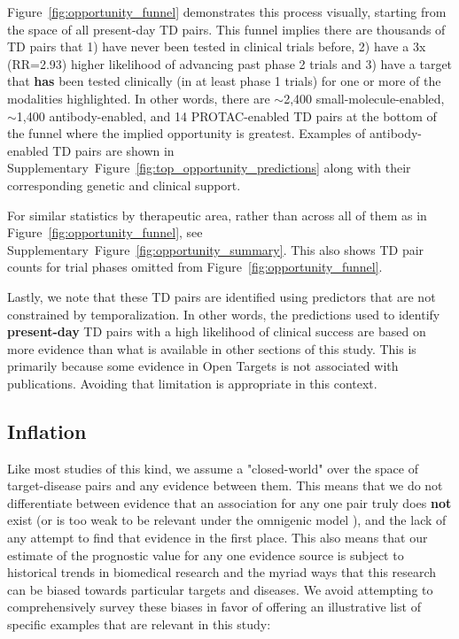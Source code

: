 \documentclass{article}
\begin{document}
Figure~\ref{fig:opportunity_funnel} demonstrates this process visually, starting from the space of all present-day TD pairs. This funnel implies there are thousands of TD pairs that 1) have never been tested in clinical trials before, 2) have a 3x (RR=2.93) higher likelihood of advancing past phase 2 trials and 3) have a target that \textbf{has} been tested clinically (in at least phase 1 trials) for one or more of the 
modalities highlighted. In other words, there are $\sim$2,400 small-molecule-enabled, $\sim$1,400 antibody-enabled, and 14 PROTAC-enabled TD pairs at the bottom of the funnel where the implied opportunity is greatest. Examples of antibody-enabled TD pairs are shown in Supplementary~Figure~\ref{fig:top_opportunity_predictions} along with their corresponding genetic and clinical support.

For similar statistics by therapeutic area, rather than across all of them as in Figure~\ref{fig:opportunity_funnel}, see Supplementary~Figure~\ref{fig:opportunity_summary}. This also shows TD pair counts for trial phases omitted from Figure~\ref{fig:opportunity_funnel}.

Lastly, we note that these TD pairs are identified using predictors that are not constrained by temporalization. In other words, the predictions used to identify \textbf{present-day} TD pairs with a high likelihood of clinical success are based on more evidence than what is available in other sections of this study. This is primarily because some evidence in Open Targets is not associated with publications. Avoiding that limitation is appropriate in this context.

\subsection{Inflation}
\label{sec:results_inflation}

Like most studies of this kind, we assume a "closed-world" \cite{Paliwal2020-hr} over the space of target-disease pairs and any evidence between them. This means that we do not differentiate between evidence that an association for any one pair truly does \textbf{not} exist (or is too weak to be relevant under the omnigenic model \cite{PMID:28622505}), and the lack of any attempt to find that evidence in the first place. This also means that our estimate of the prognostic value for any one evidence source is subject to historical trends in biomedical research and the myriad ways that this research can be biased towards particular targets and diseases. We avoid attempting to comprehensively survey these biases in favor of offering an illustrative list of specific examples that are relevant in this study:
\end{document}
